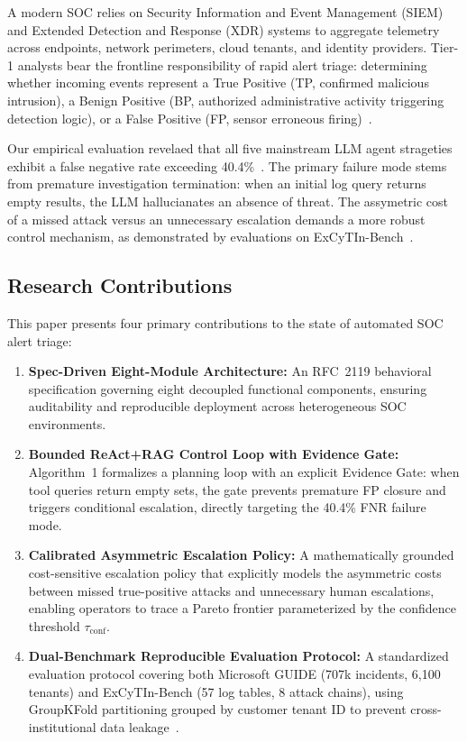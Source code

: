 A modern SOC relies on Security Information and Event Management (SIEM) and Extended
Detection and Response (XDR) systems to aggregate telemetry across endpoints, network
perimeters, cloud tenants, and identity providers. Tier-1 analysts bear the frontline
responsibility of rapid alert triage: determining whether incoming events represent a
True Positive (TP, confirmed malicious intrusion), a Benign Positive (BP, authorized
administrative activity triggering detection logic), or a False Positive (FP, sensor
erroneous firing)~\cite{alahmadi2022falsepositives}.

Our empirical evaluation revelaed that all five mainstream LLM agent strageties exhibit
a false negative rate exceeding 40.4\%~\cite{tsegai2026aida_missing}. The primary
failure mode stems from premature investigation termination: when an initial log query
returns empty results, the LLM hallucianates an absence of threat. The assymetric cost
of a missed attack versus an unnecessary escalation demands a more robust control
mechanism, as demonstrated by evaluations on ExCyTIn-Bench~\cite{wu2026excytin_missing}.

\subsection{Research Contributions}

This paper presents four primary contributions to the state of automated SOC alert triage:

\begin{enumerate}
  \item \textbf{Spec-Driven Eight-Module Architecture:} An RFC~2119 behavioral specification
  governing eight decoupled functional components, ensuring auditability and reproducible
  deployment across heterogeneous SOC environments.

  \item \textbf{Bounded ReAct+RAG Control Loop with Evidence Gate:} Algorithm~1
  formalizes a planning loop with an explicit Evidence Gate: when tool queries return
  empty sets, the gate prevents premature FP closure and triggers conditional escalation,
  directly targeting the 40.4\% FNR failure mode.

  \item \textbf{Calibrated Asymmetric Escalation Policy:} A mathematically grounded
  cost-sensitive escalation policy that explicitly models the asymmetric costs between
  missed true-positive attacks and unnecessary human escalations, enabling operators to
  trace a Pareto frontier parameterized by the confidence threshold $\tau_{\text{conf}}$.

  \item \textbf{Dual-Benchmark Reproducible Evaluation Protocol:} A standardized evaluation
  protocol covering both Microsoft GUIDE (707k incidents, 6,100 tenants) and ExCyTIn-Bench
  (57 log tables, 8 attack chains), using GroupKFold partitioning grouped by customer tenant
  ID to prevent cross-institutional data leakage~\cite{arp2022dos}.
\end{enumerate}

